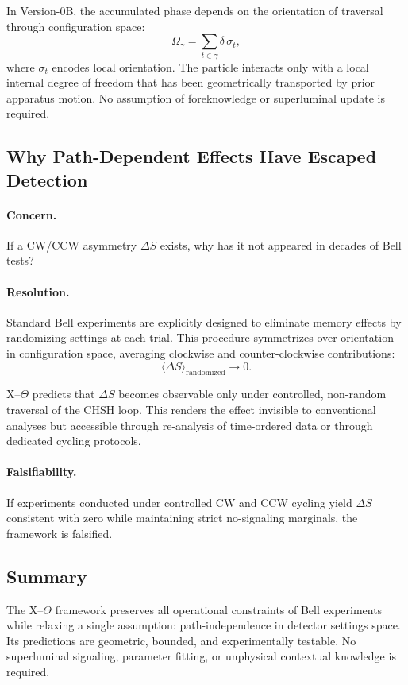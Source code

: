 In Version-0B, the accumulated phase depends on the orientation of traversal through
configuration space:
\begin{equation}
\Omega_{\gamma} = \sum_{t \in \gamma} \delta\, \sigma_t,
\end{equation}
where $\sigma_t$ encodes local orientation.
The particle interacts only with a local internal degree of freedom that has been
geometrically transported by prior apparatus motion.
No assumption of foreknowledge or superluminal update is required.

\subsection{Why Path-Dependent Effects Have Escaped Detection}

\paragraph{Concern.}
If a CW/CCW asymmetry $\Delta S$ exists, why has it not appeared in decades of Bell tests?

\paragraph{Resolution.}
Standard Bell experiments are explicitly designed to eliminate memory effects by
randomizing settings at each trial.
This procedure symmetrizes over orientation in configuration space, averaging
clockwise and counter-clockwise contributions:
\begin{equation}
\langle \Delta S \rangle_{\mathrm{randomized}} \rightarrow 0.
\end{equation}

X--$\Theta$ predicts that $\Delta S$ becomes observable only under controlled,
non-random traversal of the CHSH loop.
This renders the effect invisible to conventional analyses but accessible through
re-analysis of time-ordered data or through dedicated cycling protocols.

\paragraph{Falsifiability.}
If experiments conducted under controlled CW and CCW cycling yield $\Delta S$
consistent with zero while maintaining strict no-signaling marginals,
the framework is falsified.

\subsection{Summary}

The X--$\Theta$ framework preserves all operational constraints of Bell experiments
while relaxing a single assumption: path-independence in detector settings space.
Its predictions are geometric, bounded, and experimentally testable.
No superluminal signaling, parameter fitting, or unphysical contextual knowledge
is required.
